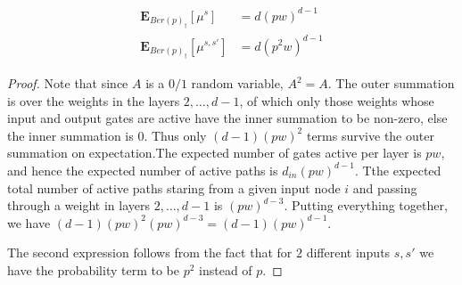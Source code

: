 \begin{lemma}\label{lm:dgn-fra}
\begin{align*}
\mathbf{E}_{Ber(p)_{\dagger}}\left[\mu^{s}\right]&= d(pw)^{d-1}\\
\mathbf{E}_{Ber(p)_{\dagger}}\left[\mu^{s,s'}\right]&= d(p^2w)^{d-1}
\end{align*}
\end{lemma}
\begin{proof}
Note that since $A$ is a $0/1$ random variable, $A^2=A$. The outer summation is over the weights in the layers $2,\ldots,d-1$, of which only those weights whose input and output gates are active have the inner summation to be non-zero, else the inner summation is $0$. Thus only $(d-1)(pw)^2$ terms survive the outer summation on expectation.The expected number of gates active per layer is $pw$, and hence the expected number of active paths is $d_{in}(pw)^{d-1}$. Tthe expected total number of active paths staring from a given input node $i$ and passing through a weight in layers $2,\ldots,d-1$ is $(pw)^{d-3}$. Putting everything together, we have $(d-1)(pw)^2(pw)^{d-3}=(d-1)(pw)^{d-1}$.

The second expression follows from the fact that for $2$ different inputs $s,s'$ we have the probability term to be $p^2$ instead of $p$.
\end{proof}

